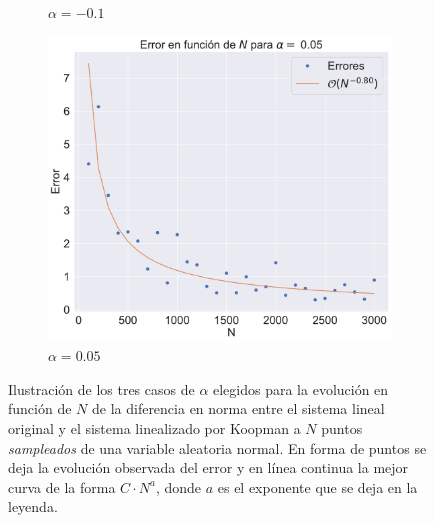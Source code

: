 \begin{figure}[h]
\begin{subfigure}[b]{0.32\textwidth}
        \caption{$\alpha=-0.1$}
        \label{fig:Linear2Errors}
    \end{subfigure}
    \hfill
    \begin{subfigure}[b]{0.32\textwidth}
        \centering
        \includegraphics[width=\textwidth]{img/content/chapter3/Linear3Errors.pdf}
        \caption{$\alpha=0.05$}
        \label{fig:image3}
    \end{subfigure}
    \caption{Ilustración de los tres casos de $\alpha$ elegidos para la evolución en función de $N$ de la diferencia en norma entre el sistema lineal original y el sistema linealizado por Koopman a $N$ puntos \textit{sampleados} de una variable aleatoria normal. En forma de puntos se deja la evolución observada del error y en línea continua la mejor curva de la forma $C \cdot N^{a}$, donde $a$ es el exponente que se deja en la leyenda.}
    \label{fig:ErrorLin}
\end{figure}
